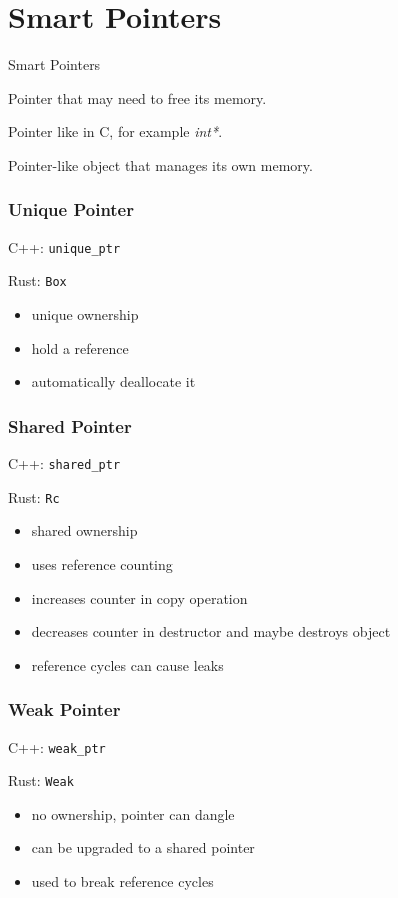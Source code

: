 \documentclass[xcolor=colortbl
]{beamer}
\begin{document}
\section{Smart Pointers}

\begin{frame}{Smart Pointers}
    \begin{definition}
        Pointer that may need to free its memory.
    \end{definition}
    \begin{definition}
        Pointer like in C, for example \emph{int*}.
    \end{definition}
    \begin{definition}
        Pointer-like object that manages its own memory.
    \end{definition}
\end{frame}

\begin{frame}[fragile]
    \frametitle{Unique Pointer}
    C++: \verb|unique_ptr| 
    
    Rust: \verb|Box|
    
    
    \begin{itemize}
        \item unique ownership
        \item hold a reference
        \item automatically deallocate it
    \end{itemize}
\end{frame}

\begin{frame}[fragile]
    \frametitle{Shared Pointer}
    C++: \verb|shared_ptr| 
    
    Rust: \verb|Rc|
  
    \begin{itemize}
        \item shared ownership
        \item uses reference counting
        \item increases counter in copy operation
        \item decreases counter in destructor and maybe destroys object
        \item reference cycles can cause leaks
    \end{itemize}
\end{frame}

\begin{frame}[fragile]
    \frametitle{Weak Pointer}
    C++: \verb|weak_ptr| 
    
    Rust: \verb|Weak|
    
    \begin{itemize}
        \item no ownership, pointer can dangle
        \item can be upgraded to a shared pointer
        \item used to break reference cycles
    \end{itemize}
\end{frame}
\end{document}
